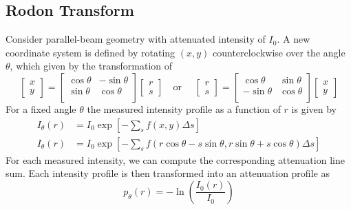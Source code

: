 \documentclass[../../../main.tex]{subfiles}
\begin{document}
\subsection{Rodon Transform}
Consider parallel-beam geometry with attenuated intensity of $I_0$.
A new coordinate system is defined by rotating $(x,y)$ counterclockwise over the angle $\theta$, which given by the transformation of
\begin{equation*}
    \begin{bmatrix}
        x \\y
    \end{bmatrix}
    =
    \begin{bmatrix}
        \cos \theta & -\sin \theta \\
        \sin \theta & \cos \theta  \\
    \end{bmatrix}
    \begin{bmatrix}
        r \\s
    \end{bmatrix}
    \quad \text{or }\quad
    \begin{bmatrix}
        r \\s
    \end{bmatrix}
    =
    \begin{bmatrix}
        \cos \theta  & \sin \theta \\
        -\sin \theta & \cos \theta \\
    \end{bmatrix}
    \begin{bmatrix}
        x \\y
    \end{bmatrix}
\end{equation*}
For a fixed angle $\theta$ the measured intensity profile as a function of $r$ is given by
\begin{align*}
    I_\theta(r) & = I_0 \exp \left[ -\sum_s f(x,y)\Delta s \right]                                                                    \\
    I_\theta(r) & = I_0 \exp \left[ -\sum_s f \left( r \cos \theta-s \sin \theta,r \sin \theta+s \cos \theta \right) \Delta s \right]
\end{align*}
For each measured intensity, we can compute the corresponding attenuation line sum.
Each intensity profile is then transformed into an attenuation profile as
\begin{equation*}
    p_\theta(r)=-\ln \left(  \frac{I_0(r )}{I_0}\right)
\end{equation*}
\end{document}
